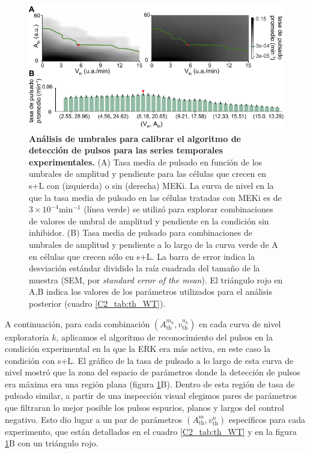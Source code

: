 \documentclass[./main.tex]{subfiles}
\begin{document}
\begin{figure}
    \centering
    \includegraphics[width=1\columnwidth]{figures/chapter2/C2_umbrales.pdf} 
    \caption{\textbf{Análisis de umbrales para calibrar el algoritmo de detección de pulsos para las series temporales experimentales.} (A) Tasa media de pulsado en función de los umbrales de amplitud y pendiente para las células que crecen en s+L con (izquierda) o sin (derecha) MEKi. La curva de nivel en la que la tasa media de pulsado en las células tratadas con MEKi es de $3\times10^{-4} \text{min}^{-1}$ (línea verde) se utilizó para explorar combinaciones de valores de umbral de amplitud y pendiente en la condición sin inhibidor. (B) Tasa media de pulsado para combinaciones de umbrales de amplitud y pendiente a lo largo de la curva verde de A en células que crecen sólo en s+L. La barra de error indica la desviación estándar dividido la raíz cuadrada del tamaño de la muestra (SEM, por \textit{standard error of the mean}). El triángulo rojo en A,B indica los valores de los parámetros utilizados para el análisis posterior (cuadro \ref{C2_tab:th_WT}).}
    \label{C2_fig:umbrales}
\end{figure}


A continuación, para cada combinación $(A_{\text{th}}^{m_k} , v_{\text{th}}^{n_k})$ en cada curva de nivel exploratoria $k$, aplicamos el algoritmo de reconocimiento del pulsos en la condición experimental en la que la ERK era más activa, en este caso la condición con s+L. El gráfico de la tasa de pulsado a lo largo de esta curva de nivel mostró que la zona del espacio de parámetros donde la detección de pulsos era máxima era una región plana (figura \ref{C2_fig:umbrales}B). Dentro de esta región de tasa de pulsado similar, a partir de una inspección visual elegimos pares de parámetros que filtraran lo mejor posible los pulsos espurios, planos y largos del control negativo. Esto dio lugar a un par de parámetros $(A_{\text{th}}^m , v_{\text{th}}^n)$ específicos para cada experimento, que están detallados en el cuadro \ref{C2_tab:th_WT} y en la figura \ref{C2_fig:umbrales}B con un triángulo rojo.
\end{document}
